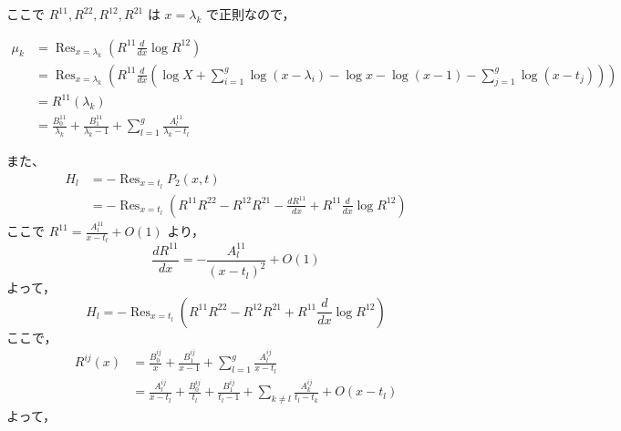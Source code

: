 \documentclass[paper=a4, fontsize=11pt]{jlreq} %
\theoremstyle{break}
\theoremstyle{qa}
\begin{document}
ここで $R^{11}, R^{22}, R^{12}, R^{21}$ は $x = \lambda_k$ で正則なので，

\begin{align*}
    \mu_k &= \mathop{\mathrm{Res}}_{x=\lambda_k} \left( R^{11} \frac{d}{dx} \log R^{12} \right) \\
    &= \mathop{\mathrm{Res}}_{x=\lambda_k} \left( R^{11} \frac{d}{dx} \left( \log X + \sum_{i=1}^g \log (x-\lambda_i) - \log x - \log (x-1) - \sum_{j=1}^g \log (x-t_j) \right) \right) \\
    &= R^{11}(\lambda_k) \\
    &= \frac{B_0^{11}}{\lambda_k} + \frac{B_1^{11}}{\lambda_k - 1} + \sum_{l=1}^g \frac{A_l^{11}}{\lambda_k - t_l}
\end{align*}

また、
\begin{align*}
    H_l &= -\mathop{\mathrm{Res}}_{x=t_l} P_2(x, t) \\
    &= -\mathop{\mathrm{Res}}_{x=t_l} \left( R^{11} R^{22} - R^{12} R^{21} - \frac{dR^{11}}{dx} + R^{11} \frac{d}{dx} \log R^{12} \right)
\end{align*}
ここで $R^{11} = \frac{A_l^{11}}{x-t_l} + O(1)$ より，
$$
\frac{dR^{11}}{dx} = -\frac{A_l^{11}}{(x-t_l)^2} + O(1)
$$
よって，
$$
H_l = -\mathop{\mathrm{Res}}_{x=t_l} \left( R^{11} R^{22} - R^{12} R^{21} + R^{11} \frac{d}{dx} \log R^{12} \right)
$$
ここで，
\begin{align*}
    R^{ij}(x) &= \frac{B_0^{ij}}{x} + \frac{B_1^{ij}}{x-1} + \sum_{l=1}^g \frac{A_l^{ij}}{x-t_l} \\
    &= \frac{A_l^{ij}}{x-t_l} + \frac{B_0^{ij}}{t_l} + \frac{B_1^{ij}}{t_l-1} + \sum_{k \neq l} \frac{A_k^{ij}}{t_l-t_k} + O(x-t_l)
\end{align*}
よって，
\end{document}

